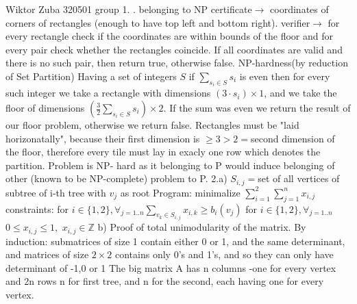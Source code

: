 \documentclass{article}
\begin{document}
Wiktor Zuba 320501 group 1.
\newline{}.\newline
belonging to NP\newline
certificate$\rightarrow$ coordinates of corners of rectangles (enough to have top left and bottom right).\newline
verifier$\rightarrow$ for every rectangle check if the coordinates are within bounds of the floor and for every pair check whether the rectangles coincide.
If all coordinates are valid and there is no such pair, then return true, otherwise false.\newline
%
NP-hardness(by reduction of Set Partition)\newline
Having a set of integers $S$ if $\sum\limits_{s_i\in S}s_i$ is even then for every such integer we take a rectangle with dimensions $(3\cdot s_i)\times 1$, and we take the floor of dimensions 
$(\frac{3}{2}\sum\limits_{s_i\in S}s_i)\times 2$. If the sum was even we return the result of our floor problem, otherwise we return false.
Rectangles must be "laid horizonatally", because their first dimension is $\ge3>2=$second dimension of the floor, therefore every tile must lay in exacly one row which denotes the partition.
Problem is NP- hard as it belonging to P would induce belonging of other (known to be NP-complete) problem to P.\newline\newline
%
2.a)\newline
$S_{i,j}=${set of all vertices of subtree of i-th tree with $v_j$ as root}\newline
Program:
minimalize $\sum\limits_{i=1}^{2}\sum\limits_{j=1}^{n}x_{i,j}$\newline
constraints:\newline
for $i\in\{1,2\},\forall_{j=1..n}\sum\limits_{v_k\in S_{i,j}}x_{i,k}\ge b_i(v_j)$\newline
for $i\in\{1,2\},\forall_{j=1..n}$ $0\le x_{i,j}\le 1,$ $x_{i,j}\in\mathbb{Z}$\newline
b) Proof of total unimodularity of the matrix.\newline
By induction: submatrices of size 1 contain either 0 or 1, and the same determinant, and matrices of size $2\times 2$ contains only 0's and 1's, and so they can only have determinant of -1,0 or 1\newline
The big matrix A has n columns -one for every vertex and 2n rows n for first tree, and n for the second, each having one for every vertex.
\end{document}
